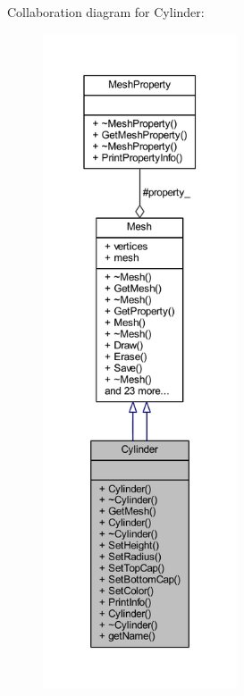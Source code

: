 Collaboration diagram for Cylinder\+:
\nopagebreak
\begin{figure}[H]
\begin{center}
\leavevmode
\includegraphics[height=550pt]{class_cylinder__coll__graph}
\end{center}
\end{figure}
